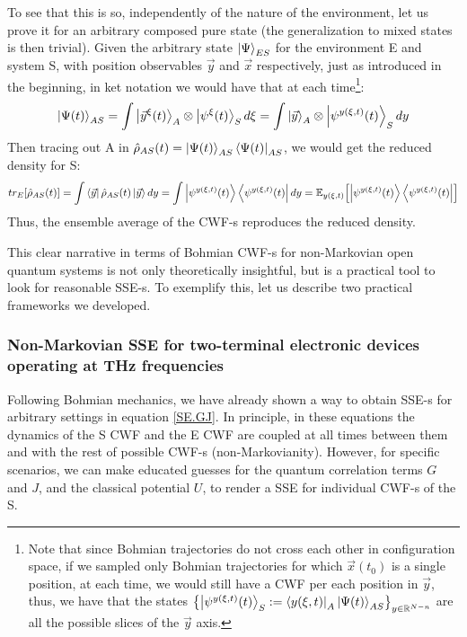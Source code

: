 \documentclass[11pt, a4paper]{article} %
\newcommand{\R}{\mathbb{R}} %
\begin{document}
To see that this is so, independently of the nature of the environment, let us prove it for an arbitrary composed pure state (the generalization to mixed states is then trivial). Given the arbitrary state $\ket{\Psi}_{ES}$ for the environment E and system S, with position observables $\vec{y}$ and $\vec{x}$ respectively, just as introduced in the beginning, in ket notation we would have that at each time\footnote{Note that since Bohmian trajectories do not cross each other in configuration space, if we sampled only Bohmian trajectories for which $\vec{x}(t_0)$ is a single position, at each time, we would still have a CWF per each position in $\vec{y}$, thus, we have that the states $\qty{\ket{\psi^{y(\xi,t)}(t)}_S:=\bra{y(\xi,t)}_A\ket{\Psi(t)}_{AS}}_{y\in\R^{N-n}}$ are all the possible slices of the $\vec{y}$ axis.}:
\begin{equation}
\ket{\Psi(t)}_{AS}=\int\ket{\vec{y}^\xi(t)}_A\otimes \ket{\psi^\xi(t)}_S d\xi = \int\ket{\vec{y}}_A\otimes \ket{\psi^{y(\xi,t)}(t)}_S dy
\end{equation}
Then tracing out A in $\hat{\rho}_{AS}(t)=\ket{\Psi(t)}_{AS}\bra{\Psi(t)}_{AS}$, we would get the reduced density for S:
\begin{equation}
tr_E\qty[\hat{\rho}_{AS}(t)] = \int\bra{\vec{y}}\hat{\rho}_{AS}(t)\ket{\vec{y}}dy = \int \ket{\psi^{y(\xi,t)}(t)}\bra{\psi^{y(\xi,t)}(t)} dy = \mathbb{E}_{y(\xi,t)}\qty[\ket{\psi^{y(\xi,t)}(t)}\bra{\psi^{y(\xi,t)}(t)}]
\end{equation}
Thus, the ensemble average of the CWF-s reproduces the reduced density.

This clear narrative in terms of Bohmian CWF-s for non-Markovian open quantum systems is not only theoretically insightful, but is a practical tool to look for reasonable SSE-s. To exemplify this, let us describe two practical frameworks we developed.

\subsubsection*{Non-Markovian SSE for two-terminal electronic devices operating at THz frequencies}
Following Bohmian mechanics, we have already shown a way to obtain SSE-s for arbitrary settings in equation \eqref{SE.GJ}. In principle, in these equations the dynamics of the S CWF and the E CWF are coupled at all times between them and with the rest of possible CWF-s (non-Markovianity). However, for specific scenarios, we can make educated guesses for the quantum correlation terms $G$ and $J$, and the classical potential $U$, to render a SSE for individual CWF-s of the S.
\end{document}
